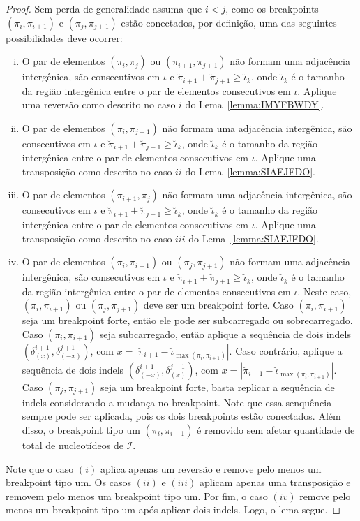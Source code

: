 \begin{proof}
Sem perda de generalidade assuma que $i < j$, como os breakpoints $(\pi_i,\pi_{i+1})$ e $(\pi_j,\pi_{j+1})$ estão conectados, por definição, uma das seguintes possibilidades deve ocorrer:
\begin{enumerate}[i.]
  \item O par de elementos $(\pi_i,\pi_{j})$ ou $(\pi_{i+1},\pi_{j+1})$ não formam uma adjacência intergênica, são consecutivos em $\iota$ e $\breve\pi_{i+1} + \breve\pi_{j+1} \ge \breve\iota_k$, onde $\breve\iota_k$ é o tamanho da região intergênica entre o par de elementos consecutivos em $\iota$. Aplique uma reversão como descrito no caso $i$ do Lema~\ref{lemma:IMYFBWDY}.
  \item O par  de elementos $(\pi_i,\pi_{j+1})$ não formam uma adjacência intergênica, são consecutivos em $\iota$ e $\breve\pi_{i+1} + \breve\pi_{j+1} \ge \breve\iota_k$, onde $\breve\iota_k$ é o tamanho da região intergênica entre o par de elementos consecutivos em $\iota$. Aplique uma transposição como descrito no caso $ii$ do Lema~\ref{lemma:SIAFJFDO}.
  \item O par de elementos $(\pi_{i+1},\pi_{j})$ não formam uma adjacência intergênica, são consecutivos em $\iota$ e $\breve\pi_{i+1} + \breve\pi_{j+1} \ge \breve\iota_k$, onde $\breve\iota_k$ é o tamanho da região intergênica entre o par de elementos consecutivos em $\iota$. Aplique uma transposição como descrito no caso $iii$ do Lema~\ref{lemma:SIAFJFDO}.
  \item O par de elementos $(\pi_{i},\pi_{i+1})$ ou $(\pi_{j},\pi_{j+1})$ não formam uma adjacência intergênica, são consecutivos em $\iota$ e $\breve\pi_{i+1} + \breve\pi_{j+1} \ge \breve\iota_k$, onde $\breve\iota_k$ é o tamanho da região intergênica entre o par de elementos consecutivos em $\iota$. Neste caso, $(\pi_{i},\pi_{i+1})$ ou $(\pi_{j},\pi_{j+1})$ deve ser um breakpoint forte. Caso $(\pi_{i},\pi_{i+1})$ seja um breakpoint forte, então ele pode ser subcarregado ou sobrecarregado. Caso $(\pi_{i},\pi_{i+1})$ seja subcarregado, então aplique a sequência de dois indels $(\delta^{i+1}_{(x)}, \delta^{j+1}_{(-x)})$, com $x=|\breve\pi_{i+1} - \breve\iota_{\max(\pi_i, \pi_{i+1})}|$. Caso contrário, aplique a sequência de dois indels $(\delta^{i+1}_{(-x)}, \delta^{j+1}_{(x)})$, com $x=|\breve\pi_{i+1} - \breve\iota_{\max(\pi_i, \pi_{i+1})}|$. Caso $(\pi_{j},\pi_{j+1})$ seja um breakpoint forte, basta replicar a sequência de indels considerando a mudança no breakpoint. Note que essa senquência sempre pode ser aplicada, pois os dois breakpoints estão conectados. Além disso, o breakpoint tipo um $(\pi_i,\pi_{i+1})$ é removido sem afetar quantidade de total de nucleotídeos de $\mathcal{I}$.  
\end{enumerate}
Note que o caso $(i)$ aplica apenas um reversão e remove pelo menos um breakpoint tipo um. Os casos $(ii)$ e $(iii)$ aplicam apenas uma transposição e removem pelo menos um breakpoint tipo um. Por fim, o caso $(iv)$ remove pelo menos um breakpoint tipo um após aplicar dois indels. Logo, o lema segue.
\end{proof}

